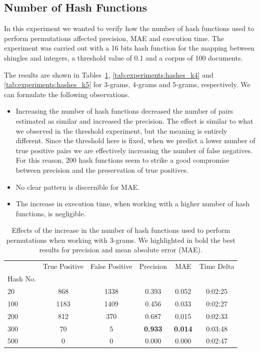 \documentclass[runningheads]{llncs}
\begin{document}
\subsection{Number of Hash Functions}
\label{subsec:experiments:hashes}

In this experiment we wanted to verify how the number of hash functions used to perform permutations affected precision, MAE and execution time. The experiment was carried out with a 16 bits hash function for the mapping between shingles and integers, a threshold value of 0.1 and a corpus of 100 documents.

The results are shown in Tables~\ref{tab:experiments:hashes_k3}, \ref{tab:experiments:hashes_k4} and \ref{tab:experiments:hashes_k5} for 3-grams, 4-grams and 5-grams, respectively. We can formulate the following observations.

\begin{itemize}
  \item Increasing the number of hash functions decreased the number of pairs estimated as similar and increased the precision. The effect is similar to what we observed in the threshold experiment, but the meaning is entirely different. Since the threshold here is fixed, when we predict a lower number of true positive pairs we are effectively increasing the number of false negatives. For this reason, 200 hash functions seem to strike a good compromise between precision and the preservation of true positives.
  \item No clear pattern is discernible for MAE.
  \item The increase in execution time, when working with a higher number of hash functions, is negligible.
\end{itemize}


\begin{table}
  \caption{Effects of the increase in the number of hash functions used to perform permutations when working with 3-grams. We highlighted in bold the best results for precision and mean absolute error (MAE).}
  \label{tab:experiments:hashes_k3}
  \centering
  \begin{tabular}{lccccc}
    \toprule
    {} &  True Positive &  False Positive &  Precision &    MAE & Time Delta \\
    Hash No. &                &                 &            &        &            \\
    \midrule
    20         &            868 &            1338 &      0.393 &  0.052 &    0:02:25 \\
    100        &           1183 &            1409 &      0.456 &  0.033 &    0:02:27 \\
    200        &            812 &             370 &      0.687 &  0.015 &    0:02:33 \\
    300        &             70 &               5 &      \textbf{0.933} &  \textbf{0.014} &    0:03:48 \\
    500        &              0 &               0 &      0.000 &  0.000 &    0:02:47 \\
    \bottomrule
    \end{tabular}
\end{table}
\end{document}
